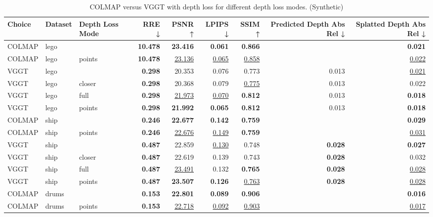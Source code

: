 \begin{table}[H]
\caption{\ifdefined\customcaption \customcaption \else COLMAP versus VGGT with depth loss for different depth loss modes. (Synthetic) \fi}
\label{tab:05_depth_loss_mode_synthetic}
\centering
\scriptsize
\begin{tabular}{lllrrrrrr}
\toprule
Choice & Dataset & Depth Loss Mode & RRE ↓ & PSNR ↑ & LPIPS ↓ & SSIM ↑ & Predicted Depth Abs Rel ↓ & Splatted Depth Abs Rel ↓ \\
\midrule
COLMAP & lego &  & \textbf{10.478} & \textbf{23.416} & \textbf{0.061} & \textbf{0.866} &  & \textbf{0.021} \\
COLMAP & lego & points & \textbf{10.478} & \underline{23.136} & \underline{0.065} & \underline{0.858} &  & \underline{0.022} \\
\midrule
VGGT & lego &  & \textbf{0.298} & 20.353 & 0.076 & 0.773 & 0.013 & \underline{0.021} \\
VGGT & lego & closer & \textbf{0.298} & 20.368 & 0.079 & \underline{0.775} & 0.013 & 0.022 \\
VGGT & lego & full & \textbf{0.298} & \underline{21.973} & \underline{0.070} & \textbf{0.812} & 0.013 & \textbf{0.018} \\
VGGT & lego & points & \textbf{0.298} & \textbf{21.992} & \textbf{0.065} & \textbf{0.812} & 0.013 & \textbf{0.018} \\
\midrule
COLMAP & ship &  & \textbf{0.246} & \textbf{22.677} & \textbf{0.142} & \textbf{0.759} &  & \textbf{0.029} \\
COLMAP & ship & points & \textbf{0.246} & \underline{22.676} & \underline{0.149} & \textbf{0.759} &  & \underline{0.031} \\
\midrule
VGGT & ship &  & \textbf{0.487} & 22.859 & \underline{0.130} & 0.748 & \textbf{0.028} & \textbf{0.027} \\
VGGT & ship & closer & \textbf{0.487} & 22.619 & 0.139 & 0.743 & \textbf{0.028} & 0.032 \\
VGGT & ship & full & \textbf{0.487} & \underline{23.491} & 0.132 & \textbf{0.765} & \textbf{0.028} & \underline{0.028} \\
VGGT & ship & points & \textbf{0.487} & \textbf{23.507} & \textbf{0.126} & \underline{0.763} & \textbf{0.028} & \underline{0.028} \\
\midrule
COLMAP & drums &  & \textbf{0.153} & \textbf{22.801} & \textbf{0.089} & \textbf{0.906} &  & \textbf{0.016} \\
COLMAP & drums & points & \textbf{0.153} & \underline{22.718} & \underline{0.092} & \underline{0.903} &  & \underline{0.017} \\

\end{tabular}
\end{table}
